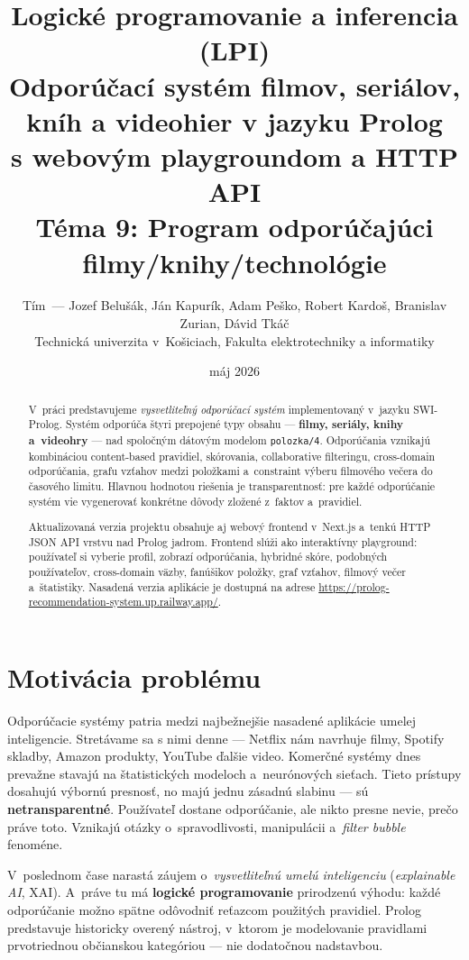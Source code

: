 \documentclass[11pt,a4paper]{article}
\title{
  \large Logické programovanie a inferencia (LPI) \\[0.4em]
  \LARGE Odporúčací systém filmov, seriálov, kníh a videohier v jazyku Prolog \\[0.2em]
  \large s webovým playgroundom a HTTP API \\[0.4em]
  \large Téma 9: Program odporúčajúci filmy/knihy/technológie
}
\author{
  Tím~--- Jozef Belušák, Ján Kapurík, Adam Peško, Robert Kardoš, Branislav Zurian, Dávid Tkáč \\
  Technická univerzita v~Košiciach, Fakulta elektrotechniky a informatiky
}
\date{máj 2026}
\begin{document}
\maketitle

\begin{abstract}
\noindent
V~práci predstavujeme \emph{vysvetliteľný odporúčací systém}
implementovaný v~jazyku SWI-Prolog. Systém odporúča štyri
prepojené typy obsahu --- \textbf{filmy, seriály, knihy a~videohry}
--- nad spoločným dátovým modelom \texttt{polozka/4}. Odporúčania
vznikajú kombináciou content-based pravidiel, skórovania,
collaborative filteringu, cross-domain odporúčania, grafu vzťahov
medzi položkami a~constraint výberu filmového večera do časového
limitu. Hlavnou hodnotou riešenia je transparentnosť: pre každé
odporúčanie systém vie vygenerovať konkrétne dôvody zložené
z~faktov a~pravidiel.

Aktualizovaná verzia projektu obsahuje aj webový frontend
v~Next.js a~tenkú HTTP JSON API vrstvu nad Prolog jadrom. Frontend
slúži ako interaktívny playground: používateľ si vyberie profil,
zobrazí odporúčania, hybridné skóre, podobných používateľov,
cross-domain väzby, fanúšikov položky, graf vzťahov, filmový večer
a~štatistiky. Nasadená verzia aplikácie je dostupná na adrese
\url{https://prolog-recommendation-system.up.railway.app/}.
\end{abstract}

\section{Motivácia problému}

Odporúčacie systémy patria medzi najbežnejšie nasadené aplikácie
umelej inteligencie. Stretávame sa s nimi denne --- Netflix nám
navrhuje filmy, Spotify skladby, Amazon produkty, YouTube ďalšie
video. Komerčné systémy dnes prevažne stavajú na štatistických
modeloch a~neurónových sieťach. Tieto prístupy dosahujú výbornú
presnosť, no majú jednu zásadnú slabinu --- sú
\textbf{netransparentné}. Používateľ dostane odporúčanie, ale
nikto presne nevie, prečo práve toto. Vznikajú otázky o~spravodlivosti,
manipulácii a~\emph{filter bubble} fenoméne.

V~poslednom čase narastá záujem o~\emph{vysvetliteľnú umelú
inteligenciu} (\emph{explainable AI}, XAI). A~práve tu má
\textbf{logické programovanie} prirodzenú výhodu: každé
odporúčanie možno spätne odôvodniť reťazcom použitých pravidiel.
Prolog predstavuje historicky overený nástroj, v~ktorom je
modelovanie pravidlami prvotriednou občianskou kategóriou ---
nie dodatočnou nadstavbou.
\end{document}
